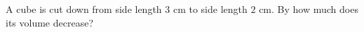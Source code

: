 A cube is cut down from side length $3$ cm to side length $2$ cm. By how much does its volume decrease?
